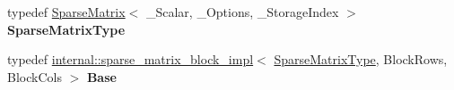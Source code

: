 \begin{DoxyCompactItemize}
typedef \hyperlink{group___sparse_core___module_class_eigen_1_1_sparse_matrix}{Sparse\+Matrix}$<$ \+\_\+\+Scalar, \+\_\+\+Options, \+\_\+\+Storage\+Index $>$ {\bfseries Sparse\+Matrix\+Type}
\item 
\mbox{\label{class_eigen_1_1_block_impl_3_01_sparse_matrix_3_01___scalar_00_01___options_00_01___storage_inded3daac10033a16d6ca9aea81cdfe7eee_a849e4149fbbc22773bfd8d841a6660d2}} 
typedef \hyperlink{class_eigen_1_1internal_1_1sparse__matrix__block__impl}{internal\+::sparse\+\_\+matrix\+\_\+block\+\_\+impl}$<$ \hyperlink{group___sparse_core___module_class_eigen_1_1_sparse_matrix}{Sparse\+Matrix\+Type}, Block\+Rows, Block\+Cols $>$ {\bfseries Base}
\end{DoxyCompactItemize}
